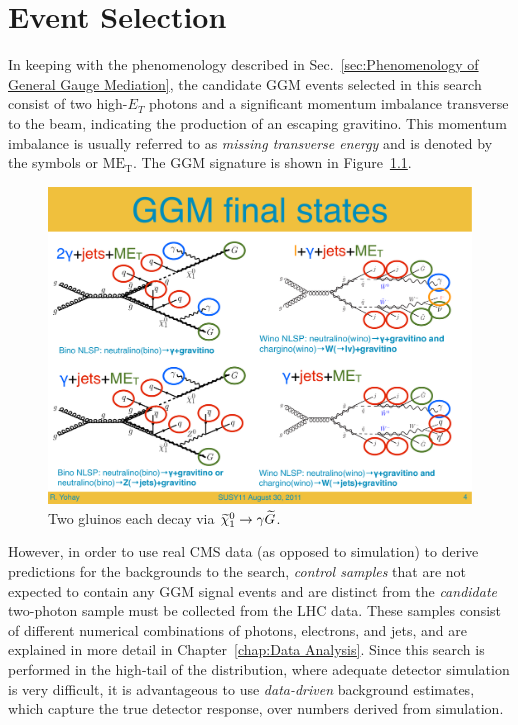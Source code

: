 \documentclass[dissertation.tex]{subfiles}
\begin{document}
\chapter{Event Selection}
\label{chap:Event Selection}

\thispagestyle{myheadings}
\markright{\hfill}

In keeping with the phenomenology described in Sec.~\ref{sec:Phenomenology of General Gauge Mediation}, the candidate GGM events selected in this search consist of two high-$E_{T}$ photons and a significant momentum imbalance transverse to the beam, indicating the production of an escaping gravitino.  This momentum imbalance is usually referred to as \textit{missing transverse energy} and is denoted by the symbols \MET or $\mbox{ME}_{\mathrm{T}}$.  The GGM signature is shown in Figure~\ref{fig:GGM_diphoton_signal_Feynman_diagram}.

\begin{figure}
	\centering
	\includegraphics[scale=0.7]{2photons_jets_MET}
	\caption{Two gluinos each decay via $\widetilde{\chi}_{1}^{0}\rightarrow\gamma\widetilde{G}$.}
	\label{fig:GGM_diphoton_signal_Feynman_diagram}
\end{figure}

However, in order to use real CMS data (as opposed to simulation) to derive predictions for the backgrounds to the search, \textit{control samples} that are not expected to contain any GGM signal events and are distinct from the \textit{candidate} two-photon sample must be collected from the LHC data.  These samples consist of different numerical combinations of photons, electrons, and jets, and are explained in more detail in Chapter~\ref{chap:Data Analysis}.  Since this search is performed in the high-\MET tail of the \MET distribution, where adequate detector simulation is very difficult, it is advantageous to use \textit{data-driven} background estimates, which capture the true detector response, over numbers derived from simulation.
\end{document}
